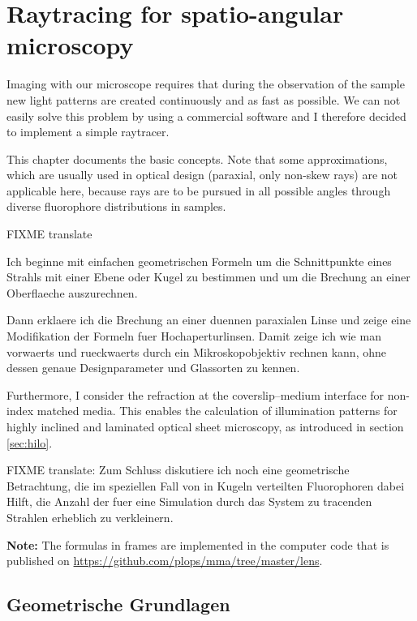 \chapter{Raytracing for spatio-angular microscopy}
\label{sec:raytrace}
\renewcommand{\i}{\nvect i}
\begin{summary}
  Imaging with our microscope requires that during the observation of
  the sample new light patterns are created continuously and as fast
  as possible. We can not easily solve this problem by using a
  commercial software and I therefore decided to implement a simple
  raytracer.

  This chapter documents the basic concepts. Note that some
  approximations, which are usually used in optical design (paraxial,
  only non-skew rays) are not applicable here, because rays are to be
  pursued in all possible angles through diverse fluorophore
  distributions in samples.

FIXME translate

Ich beginne mit einfachen geometrischen Formeln um die Schnittpunkte
eines Strahls mit einer Ebene oder Kugel zu bestimmen und um die
Brechung an einer Oberflaeche auszurechnen.

Dann erklaere ich die Brechung an einer duennen paraxialen Linse und
zeige eine Modifikation der Formeln fuer Hochaperturlinsen. Damit
zeige ich wie man vorwaerts und rueckwaerts durch ein
Mikroskopobjektiv rechnen kann, ohne dessen genaue Designparameter und
Glassorten zu kennen.

Furthermore, I consider the refraction at the coverslip--medium
interface for non-index matched media. This enables the calculation of
illumination patterns for highly inclined and laminated optical sheet
microscopy, as introduced in section \ref{sec:hilo}.

FIXME translate: Zum Schluss diskutiere ich noch eine geometrische
Betrachtung, die im speziellen Fall von in Kugeln verteilten
Fluorophoren dabei Hilft, die Anzahl der fuer eine Simulation durch
das System zu tracenden Strahlen erheblich zu verkleinern.

{\bf Note:} The formulas in frames are implemented in the computer
code that is published on
\url{https://github.com/plops/mma/tree/master/lens}.
\end{summary}
\section{Geometrische Grundlagen}
